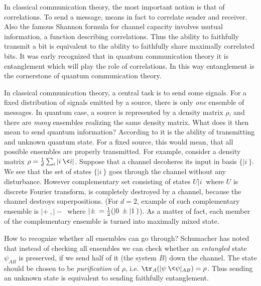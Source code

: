\documentclass[twocolumn,aps,rmp]{revtex4}
\begin{document}
In classical communication theory, the most important notion is that
of correlations. To send a message, means in fact to correlate
sender and receiver. Also the famous Shannon formula for channel
capacity involves mutual information, a function describing
correlations. Thus the ability to faithfully transmit a bit is
equivalent to the ability to faithfully share maximally correlated
bits. It was early recognized that in quantum communication theory
it is entanglement which will play the role of correlations. In this
way entanglement is the cornerstone of quantum communication theory.

In classical communication theory, a central task is to send some
signals. For a fixed distribution of signals emitted by a source,
there is only {\it one} ensemble of messages.  In quantum case, a
source is represented by a density matrix $\rho$, and there are {\it
many} ensembles realizing the same density matrix. What does it then
mean to send quantum information? According to \cite{Teleportation}
it is the ability of transmitting and unknown quantum state. For a
fixed source, this would mean, that all possible ensembles are
properly transmitted. For example, consider a density matrix
$\rho={1\over d} \sum_i |i\>\<i|$. Suppose that a channel decoheres
its input  in basis $\{|i\>\}$. We see that the set of states
$\{|i\>\}$ goes through the channel without any
disturbance. However complementary set consisting of states
$U|i\>$ where $U$ is discrete Fourier transform, is completely
destroyed by a channel, because the channel destroys superpositions.
(For $d=2$, example of such complementary ensemble is $|+\>,|-\>$
where $|\pm\>={1\over 2} (|0\>\pm|1\>)$).
As a matter of fact, each member of the complementary ensemble is
turned into maximally mixed state.

How to recognize whether all ensembles can go through?  Schumacher
has noted \cite{Schumacher1995} that instead of checking all
ensembles we can check
whether an {\it entangled} state $\psi_{AB}$ is preserved, if we send half
of it (the system $B$) down the channel. The state should be chosen
to be {\it purification} of $\rho$, i.e.
$\tr_A(|\psi\>\<\psi|_{AB})=\rho$. Thus sending an unknown state is
equivalent to sending faithfully entanglement.
\end{document}
